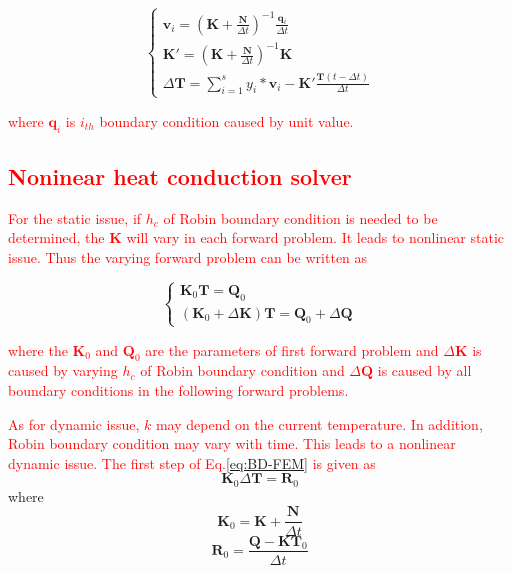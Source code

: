 \documentclass[review]{elsarticle}
\begin{document}
\begin{equation}
    \left\{\begin{array}{lr}
    \mathbf{v}_i = \left( \mathbf{K}+\frac{\mathbf{N}}{\Delta t}\right)^{-1} \frac{\mathbf{q}_i}{\Delta t}\\
    \mathbf{K}' = \left( \mathbf{K}+\frac{\mathbf{N}}{\Delta t}\right)^{-1}\mathbf{K}\\
    \Delta\mathbf{T} = \sum_{i=1}^s y_i*\mathbf{v}_i-\mathbf{K}'\frac{\mathbf{T}(t-\Delta t)}{\Delta t}
  \end{array}
\right.
\end{equation}

\noindent \textcolor{red}{where $\mathbf{q}_i$ is $i_{th}$ boundary condition caused by unit value.}

\subsection{\textcolor{red}{Noninear heat conduction solver}}
\textcolor{red}{For the static issue, if $h_c$ of Robin boundary condition is needed to be determined, the $\mathbf{K}$ will vary in each forward problem. It leads to nonlinear static issue. Thus the varying forward problem can be written as}

\begin{equation}
    \left\{\begin{array}{lr}
    \mathbf{K}_0 \mathbf{T}  =  \mathbf{Q}_0\\
    (\mathbf{K}_0+\Delta \mathbf{K}) \mathbf{T}  =  \mathbf{Q}_0+\Delta \mathbf{Q}
  \end{array}
\right.
\end{equation}

\noindent \textcolor{red}{where the $\mathbf{K}_0$ and $\mathbf{Q}_0$ are the parameters of first forward problem and $\Delta \mathbf{K}$ is caused by varying $h_c$ of Robin boundary condition and $\Delta \mathbf{Q}$ is caused by all boundary conditions in the following forward problems.}

\textcolor{red}{As for dynamic issue, $k$ may depend on the current temperature. In addition, Robin boundary condition may vary with time. This leads to a nonlinear dynamic issue. The first step of Eq.\ref{eq:BD-FEM} is given as}
\begin{equation}
    \mathbf{K}_0 \Delta \mathbf{T} = \mathbf{R}_0
\end{equation}
\noindent where 
\begin{equation*}
    \mathbf{K}_0 = \mathbf{K}+\frac{\mathbf{N}}{\Delta t}
\end{equation*}
\begin{equation*}
    \mathbf{R}_0 = \frac{\mathbf{Q}-\mathbf{K}\mathbf{T}_0}{\Delta t}
\end{equation*}
\end{document}
